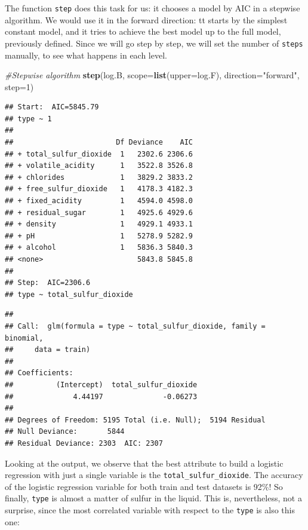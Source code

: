 \documentclass[12pt,]{article}
\newenvironment{Shaded}{\begin{snugshade}}{\end{snugshade}}
\newcommand{\KeywordTok}[1]{\textcolor[rgb]{0.13,0.29,0.53}{\textbf{{#1}}}}
\newcommand{\DataTypeTok}[1]{\textcolor[rgb]{0.13,0.29,0.53}{{#1}}}
\newcommand{\DecValTok}[1]{\textcolor[rgb]{0.00,0.00,0.81}{{#1}}}
\newcommand{\StringTok}[1]{\textcolor[rgb]{0.31,0.60,0.02}{{#1}}}
\newcommand{\CommentTok}[1]{\textcolor[rgb]{0.56,0.35,0.01}{\textit{{#1}}}}
\newcommand{\NormalTok}[1]{{#1}}
\begin{document}
The function \texttt{step} does this task for us: it chooses a model by
AIC in a stepwise algorithm. We would use it in the forward direction:
tt starts by the simplest constant model, and it tries to achieve the
best model up to the full model, previously defined. Since we will go
step by step, we will set the number of \texttt{steps} manually, to see
what happens in each level.

\begin{Shaded}
\begin{Highlighting}[]
\CommentTok{#Stepwise algorithm}
\KeywordTok{step}\NormalTok{(log.B, }\DataTypeTok{scope=}\KeywordTok{list}\NormalTok{(}\DataTypeTok{upper=}\NormalTok{log.F), }\DataTypeTok{direction=}\StringTok{"forward"}\NormalTok{, }\DataTypeTok{step=}\DecValTok{1}\NormalTok{)}
\end{Highlighting}
\end{Shaded}

\begin{verbatim}
## Start:  AIC=5845.79
## type ~ 1
## 
##                        Df Deviance    AIC
## + total_sulfur_dioxide  1   2302.6 2306.6
## + volatile_acidity      1   3522.8 3526.8
## + chlorides             1   3829.2 3833.2
## + free_sulfur_dioxide   1   4178.3 4182.3
## + fixed_acidity         1   4594.0 4598.0
## + residual_sugar        1   4925.6 4929.6
## + density               1   4929.1 4933.1
## + pH                    1   5278.9 5282.9
## + alcohol               1   5836.3 5840.3
## <none>                      5843.8 5845.8
## 
## Step:  AIC=2306.6
## type ~ total_sulfur_dioxide
\end{verbatim}

\begin{verbatim}
## 
## Call:  glm(formula = type ~ total_sulfur_dioxide, family = binomial, 
##     data = train)
## 
## Coefficients:
##          (Intercept)  total_sulfur_dioxide  
##              4.44197              -0.06273  
## 
## Degrees of Freedom: 5195 Total (i.e. Null);  5194 Residual
## Null Deviance:       5844 
## Residual Deviance: 2303  AIC: 2307
\end{verbatim}

Looking at the output, we observe that the best attribute to build a
logistic regression with just a single variable is the
\texttt{total\_sulfur\_dioxide}. The accuracy of the logistic regression
variable for both train and test datasets is 92\%! So finally,
\texttt{type} is almost a matter of sulfur in the liquid. This is,
nevertheless, not a surprise, since the most correlated variable with
respect to the \texttt{type} is also this one:
\end{document}
